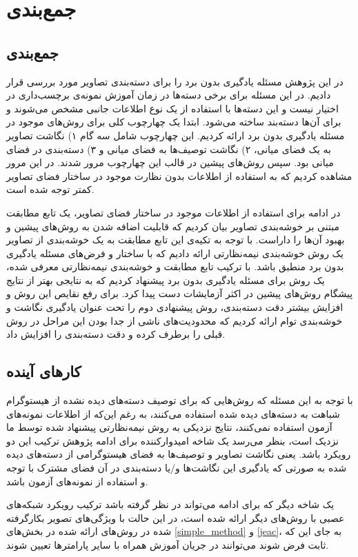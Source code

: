 \chapter{جمع‌بندی} \label{chap:conclusion}
\section{جمع‌بندی}
در این پژوهش مسئله یادگیری بدون برد را برای دسته‌بندی تصاویر مورد بررسی قرار دادیم. در این مسئله برای برخی دسته‌ها در زمان آموزش نمونه‌ی برچسب‌داری در اختیار نیست و این دسته‌ها با استفاده از یک نوع اطلاعات جانبی مشخص می‌شوند و برای آن‌ها دسته‌بند ساخته می‌شود. ابتدا یک چهارچوب کلی برای روش‌های موجود در مسئله یادگیری بدون برد ارائه کردیم. این چهارچوب شامل سه گام ۱) نگاشت تصاویر به یک فضای میانی، ۲) نگاشت توصیف‌ها به فضای میانی و ۳) دسته‌بندی در فضای میانی بود. سپس روش‌های پیشین در قالب این چهارچوب مرور شدند. در این مرور مشاهده کردیم که به استفاده از اطلاعات بدون نظارت موجود در ساختار فضای تصاویر کمتر توجه شده است. 

در ادامه برای استفاده از اطلاعات موجود در ساختار فضای تصاویر، یک تابع مطابقت مبتنی بر خوشه‌بندی تصاویر بیان کردیم که قابلیت اضافه شدن به روش‌های پیشین و بهبود آن‌ها را داراست. با توجه به تکیه‌ی این تابع مطابقت به یک خوشه‌بندی از تصاویر یک روش خوشه‌بندی نیمه‌نظارتی ارائه دادیم که با ساختار و فرض‌های مسئله یادگیری بدون برد منطبق باشد. 
 با ترکیب تابع مطابقت و خوشه‌بندی نیمه‌نظارتی معرفی شده، یک روش برای مسئله یادگیری بدون برد پیشنهاد کردیم که به نتایجی بهتر از نتایج پیشگام روش‌های پیشین در اکثر آزمایشات دست پیدا کرد. برای رفع نقایص این روش و  افزایش بیشتر دقت دسته‌بندی، روش پیشنهادی دوم را تحت عنوان یادگیری نگاشت و خوشه‌بندی توام ارائه کردیم که محدودیت‌های ناشی از جدا بودن این مراحل در روش قبلی را برطرف کرده و دقت دسته‌بندی را افزایش داد. 
\section{کار‌های آینده}
با توجه به این مسئله که روش‌هایی که برای توصیف دسته‌های دیده نشده از هیستوگرام شباهت به دسته‌های دیده شده استفاده می‌کنند، به رغم این‌که از اطلاعات نمونه‌های آزمون استفاده نمی‌کنند، نتایج نزدیکی به روش نیمه‌نظارتی پیشنهاد شده توسط ما نزدیک است، بنظر می‌رسد یک شاخه امیدوارکننده برای ادامه پژوهش ترکیب این دو رویکرد باشد. یعنی نگاشت تصاویر و توصیف‌ها به فضای هیستوگرامی از دسته‌های دیده شده به صورتی که یادگیری این نگاشت‌ها و/یا دسته‌بندی در آن فضای مشترک با توجه و استفاده از نمونه‌های آزمون باشد.

یک شاخه دیگر که برای ادامه می‌تواند در نظر گرفته باشد ترکیب رویکرد شبکه‌های عصبی با روش‌های دیگر ارائه شده است، در این حالت با ویژگی‌های تصویر بکارگرفته شده در روش‌های ارائه شده در بخش‌های
\ref{simple_method}
و \ref{jeac}، به جای این که ثابت فرض شوند می‌توانند در جریان آموزش همراه با سایر پارامترها تعیین شوند.
